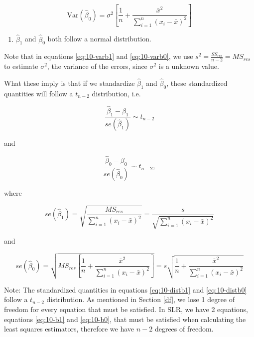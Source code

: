 \documentclass[
]{book}
\providecommand{\tightlist}{%
  \setlength{\itemsep}{0pt}\setlength{\parskip}{0pt}}
\begin{document}
\begin{equation} 
\mbox{Var}(\hat{\beta}_0) = \sigma^2 \left[\frac{1}{n} + \frac{\bar{x}^2}{\sum_{i=1}^n (x_i -\bar{x})^2}\right]
\label{eq:10-varb0}
\end{equation}

\begin{enumerate}
\def\labelenumi{\arabic{enumi}.}
\setcounter{enumi}{3}
\tightlist
\item
  \(\hat{\beta}_1\) and \(\hat{\beta}_0\) both follow a normal distribution.
\end{enumerate}

Note that in equations \eqref{eq:10-varb1} and \eqref{eq:10-varb0}, we use \(s^2 = \frac{SS_{res}}{n-2} = MS_{res}\) to estimate \(\sigma^2\), the variance of the errors, since \(\sigma^2\) is a unknown value.

What these imply is that if we standardize \(\hat{\beta}_1\) and \(\hat{\beta}_0\), these standardized quantities will follow a \(t_{n-2}\) distribution, i.e.

\begin{equation} 
\frac{\hat{\beta}_1 - \beta_1}{se(\hat{\beta}_1)}\sim t_{n-2}
\label{eq:10-distb1}
\end{equation}

and

\begin{equation} 
\frac{\hat{\beta}_0 - \beta_0}{se(\hat{\beta}_0)}\sim t_{n-2},
\label{eq:10-distb0}
\end{equation}

where

\begin{equation}
se(\hat{\beta}_1) = \sqrt{\frac{MS_{res}}{\sum_{i=1}^n{(x_{i}-\bar{x})^{2}}}} = \frac{s}{\sqrt{\sum_{i=1}^n{(x_{i}-\bar{x})^{2}}}}
\label{eq:10-seb1}
\end{equation}

and

\begin{equation} 
se(\hat{\beta}_0) = \sqrt{MS_{res}\left[\frac{1}{n} + \frac{\bar{x}^2}{\sum_{i=1}^n (x_i -\bar{x})^2}\right]} = s \sqrt{\frac{1}{n} + \frac{\bar{x}^2}{\sum_{i=1}^n (x_i -\bar{x})^2}}
\label{eq:10-seb0}
\end{equation}

Note: The standardized quantities in equations \eqref{eq:10-distb1} and \eqref{eq:10-distb0} follow a \(t_{n-2}\) distribution. As mentioned in Section \ref{df}, we lose 1 degree of freedom for every equation that must be satisfied. In SLR, we have 2 equations, equations \eqref{eq:10-b1} and \eqref{eq:10-b0}, that must be satisfied when calculating the least squares estimators, therefore we have \(n-2\) degrees of freedom.
\end{document}
